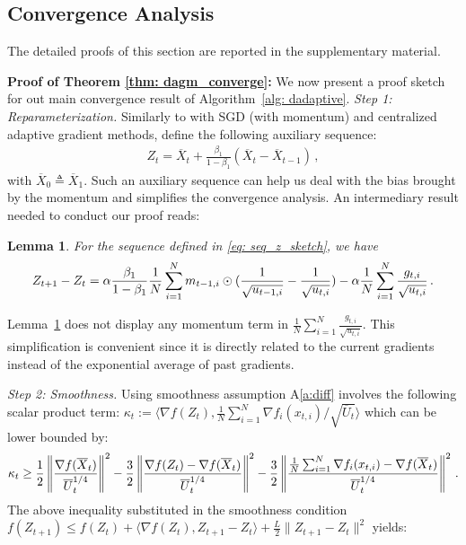 \documentclass{article} %
\newtheorem{lemma}{Lemma}
\begin{document}
\vspace{-0.05in}
\subsection{Convergence Analysis}
\vspace{-0.05in}

The detailed proofs of this section are reported in the supplementary material.

\textbf{Proof of Theorem \ref{thm: dagm_converge}:} 
We now present a proof sketch for out main convergence result of Algorithm~\ref{alg: dadaptive}. 
\textsl{Step 1: Reparameterization.} \hspace{0.01in} Similarly to \citep{yan2018unified, chen2018convergence} with SGD (with momentum) and centralized adaptive gradient methods, define the following auxiliary sequence:
 {\small
 \begin{align}\label{eq: seq_z_sketch}
 Z_{t} = \overline X_t + \frac{\beta_1}{1-\beta_1} (\overline X_t - \overline X_{t-1}) \, ,
 \end{align}
 }%
with $\overline X_{0} \triangleq \overline X_1$.
Such an auxiliary sequence can help us deal with the bias brought by the momentum and simplifies the convergence analysis. 
 An intermediary result needed to conduct our proof reads:
 \begin{lemma}\label{lem: z_diff} 
	For the sequence defined in \eqref{eq: seq_z_sketch}, we have
	\begin{align}\notag
	Z_{t+1} - Z_t = \alpha \frac{\beta_1}{1-\beta_1}  \frac{1}{N} \sum_{i=1}^N m_{t-1	,i} \odot (\frac{1}{\sqrt{u_{t-1,i}}} - \frac{1}{\sqrt{u_{t,i}}}) - \alpha \frac{1}{N} \sum_{i=1}^N \frac{g_{t,i}}{\sqrt{u_{t,i}}} \, .
	\end{align}
\end{lemma}
 Lemma~\ref{lem: z_diff} does not display any momentum term in $\frac{1}{N} \sum_{i=1}^N \frac{g_{t,i}}{\sqrt{u_{t,i}}}$.
 This simplification is convenient since it is directly related to the current gradients instead of the exponential average of past gradients.
 
 \textsl{Step 2: Smoothness.} \hspace{0.01in} Using smoothness assumption A\ref{a:diff} involves the following scalar product term: $\kappa_t := \langle \nabla f( Z_{t}), \frac{1}{N} \sum_{i=1}^N \nabla f_i( x_{t,i})/\sqrt{\overline U_{t}} \rangle$ which can be lower bounded by:
  {\small
 \begin{align} \notag
  \kappa_t \geq  \frac{1}{2} \left\|\frac{\nabla f( \overline X_{t})}{\overline U_{t}^{1/4}}\right\|^2   - \frac{3}{2} \left\|\frac{\nabla f( Z_{t}) -\nabla f( \overline X_{t})}{\overline U_{t}^{1/4}}\right\|^2- \frac{3}{2} \left\|  \frac{ \frac{1}{N}\sum_{i=1}^N \nabla f_i( x_{t,i}) -  \nabla f( \overline X_{t})}{\overline U_{t}^{1/4}}  \right\|^2 \, .
 \end{align}
 }%
 The above inequality substituted in the smoothness condition $ f( Z_{t+1}) \leq f( Z_{t}) + \langle \nabla f( Z_{t}),  Z_{t+1}-  Z_{t} \rangle + \frac{L}{2}\| Z_{t+1}-  Z_{t}\|^2 $ yields:
 
\end{document}

